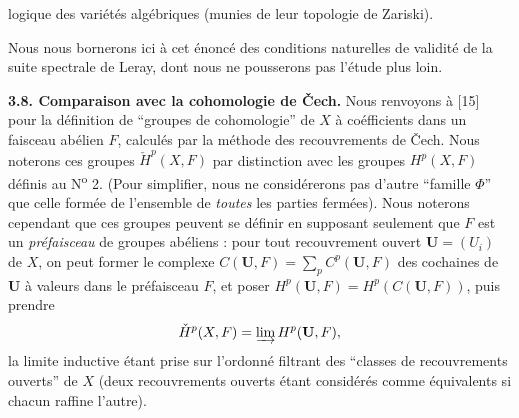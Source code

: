 
\noindent logique des variétés algébriques (munies de leur topologie de Zariski).

Nous nous bornerons ici à cet énoncé des conditions naturelles de validité de
la suite spectrale de Leray, dont nous ne pousserons pas l'étude plus loin.

\textbf{3.8. Comparaison avec la cohomologie de Čech.} Nous renvoyons à [15]
pour la définition de ``groupes de cohomologie'' de $X$ à coéfficients dans un
faisceau abélien $F$, calculés par la méthode des recouvrements de Čech.
Nous noterons ces groupes $\check H^p(X,F)$ par distinction avec les groupes
$H^p(X,F)$ définis au N\textsuperscript{o} 2. (Pour simplifier, nous ne
considérerons pas d'autre ``famille $\Phi$'' que celle formée de l'ensemble de
\textit{toutes} les parties fermées). Nous noterons cependant que ces groupes peuvent
se définir en supposant seulement que $F$ est un \textit{préfaisceau} de
groupes abéliens :
pour tout recouvrement ouvert $\mathbf U=(U_i)$ de $X$, on peut former le
complexe
$C(\mathbf U,F)=\displaystyle\sum\limits_p C^p(\mathbf U,F)$
des cochaines de $\mathbf U$ à valeurs dans le préfaisceau $F$, et poser
$H^p(\mathbf U,F)=H^p(C(\mathbf U,F))$,
puis prendre
\[
\check H^p(X,F)=\varinjlim H^p(\mathbf U,F),
\]
la limite inductive étant prise sur l'ordonné filtrant des ``classes de
recouvrements ouverts'' de $X$ (deux recouvrements ouverts étant considérés
comme équivalents si chacun raffine l'autre).

